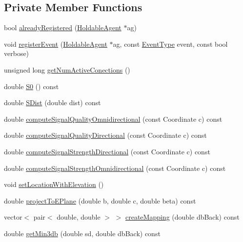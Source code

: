 \subsection*{Private Member Functions}
\begin{DoxyCompactItemize}
\item 
bool \hyperlink{class_antenna_af4fb83843393bf36bdcaefae5b5dd0dd}{already\+Registered} (\hyperlink{class_holdable_agent}{Holdable\+Agent} $\ast$ag)
\item 
void \hyperlink{class_antenna_aa21a4c0d581c59c36480d932584c0ef5}{register\+Event} (\hyperlink{class_holdable_agent}{Holdable\+Agent} $\ast$ag, const \hyperlink{_event_type_8h_a2628ea8d12e8b2563c32f05dc7fff6fa}{Event\+Type} event, const bool verbose)
\item 
unsigned long \hyperlink{class_antenna_a86c5c094ab6ea432609afa00f3a8080a}{get\+Num\+Active\+Conections} ()
\item 
double \hyperlink{class_antenna_a033246c50bec80123860154a949620c7}{S0} () const
\item 
double \hyperlink{class_antenna_ae60ab40ded94be407c3b7455f4e886fe}{S\+Dist} (double dist) const
\item 
double \hyperlink{class_antenna_a036e212fda08a9fc5215732378fc4fbd}{compute\+Signal\+Quality\+Omnidirectional} (const Coordinate c) const
\item 
double \hyperlink{class_antenna_a0bba3b0a586d5dc36397c2b9887cd42b}{compute\+Signal\+Quality\+Directional} (const Coordinate c) const
\item 
double \hyperlink{class_antenna_a38bb70c5ca249773512186c34792b43a}{compute\+Signal\+Strength\+Directional} (const Coordinate c) const
\item 
double \hyperlink{class_antenna_a26077f4061413733cedf9253ecc8686f}{compute\+Signal\+Strength\+Omnidirectional} (const Coordinate c) const
\item 
void \hyperlink{class_antenna_a4b1d0ae147826e553a044fd481d6c7e0}{set\+Location\+With\+Elevation} ()
\item 
double \hyperlink{class_antenna_a298c80a54828c8f13d584e8e382145a5}{project\+To\+E\+Plane} (double b, double c, double beta) const
\item 
vector$<$ pair$<$ double, double $>$ $>$ \hyperlink{class_antenna_afe86e36673d4b28713f983cc63d89e1b}{create\+Mapping} (double db\+Back) const
\item 
double \hyperlink{class_antenna_a1c6126c232ee496b9b693fc20e4892f5}{get\+Min3db} (double sd, double db\+Back) const
\item 

\end{DoxyCompactItemize}
